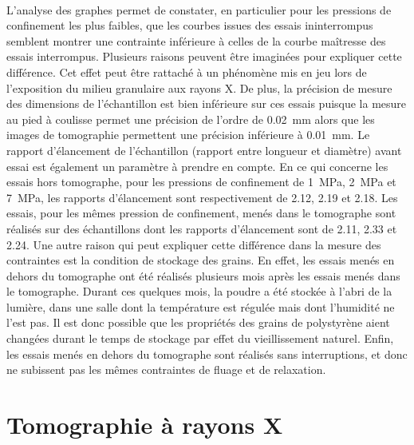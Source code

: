 		\\L'analyse des graphes permet de constater, en particulier pour les pressions de confinement les plus faibles, que les courbes issues des essais ininterrompus semblent montrer une contrainte inférieure  à celles de la courbe maîtresse des essais interrompus. Plusieurs raisons peuvent être imaginées pour expliquer cette différence. Cet effet peut être rattaché à un phénomène mis en jeu lors de l'exposition du milieu granulaire aux rayons X. De plus, la précision de mesure des dimensions de l'échantillon est bien inférieure sur ces essais puisque la mesure au pied à coulisse permet une précision de l'ordre de \SI{0.02}{\milli\meter} alors que les images de tomographie permettent une précision inférieure à \SI{0.01}{\milli\meter}. Le rapport d'élancement de l'échantillon (rapport entre longueur et diamètre) avant essai est également un paramètre à prendre en compte. En ce qui concerne les essais hors tomographe, pour les pressions de confinement de \SI{1}{\mega\pascal}, \SI{2}{\mega\pascal} et \SI{7}{\mega\pascal}, les rapports d'élancement sont respectivement de \num{2.12}, \num{2.19} et \num{2.18}. Les essais, pour les mêmes pression de confinement, menés dans le tomographe sont réalisés sur des échantillons dont les rapports d'élancement sont de \num{2.11}, \num{2.33} et \num{2.24}. Une autre raison qui peut expliquer cette différence dans la mesure des contraintes est la condition de stockage des grains. En effet, les essais menés en dehors du tomographe ont été réalisés plusieurs mois après les essais menés dans le tomographe. Durant ces quelques mois, la poudre a été stockée à l'abri de la lumière, dans une salle dont la température est régulée mais dont l'humidité ne l'est pas. Il est donc possible que les propriétés des grains de polystyrène aient changées durant le temps de stockage par effet du vieillissement naturel. Enfin, les essais menés en dehors du tomographe sont réalisés sans interruptions, et donc ne subissent pas les mêmes contraintes de fluage et de relaxation.

\section{Tomographie à rayons X}\label{para04:tomo}
